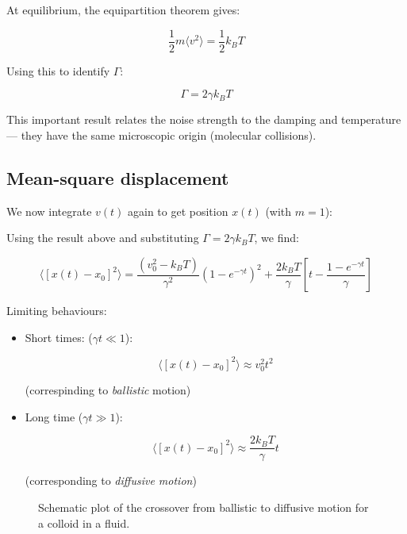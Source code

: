 \documentclass[
  letterpaper,
  enabledeprecatedfontcommands]{report}
\begin{document}
At equilibrium, the equipartition theorem gives:

\[
\frac{1}{2} m \langle v^2 \rangle = \frac{1}{2} k_B T
\]

Using this to identify \(\Gamma\):

\[
\Gamma = 2 \gamma k_B T
\]

This important result relates the noise strength to the damping and
temperature --- they have the same microscopic origin (molecular
collisions).

\subsection{Mean-square displacement}\label{mean-square-displacement}

We now integrate \(v(t)\) again to get position \(x(t)\) (with
\(m = 1\)):

Using the result above and substituting \(\Gamma = 2\gamma k_B T\), we
find:

\[
\langle [x(t) - x_0]^2 \rangle = \frac{(v_0^2 - k_B T)}{\gamma^2} (1 - e^{-\gamma t})^2 + \frac{2 k_B T}{\gamma} \left[ t - \frac{1 - e^{-\gamma t}}{\gamma} \right]
\]

Limiting behaviours:

\begin{itemize}
\item
  Short times: (\(\gamma t \ll 1\)):

  \[
  \langle [x(t) - x_0]^2 \rangle \approx v_0^2 t^2
  \]

  (correspinding to \emph{ballistic} motion)
\item
  Long time (\(\gamma t \gg 1\)):

  \[
  \langle [x(t) - x_0]^2 \rangle \approx \frac{2 k_B T}{\gamma} t
  \]

  (corresponding to \emph{diffusive motion})
\end{itemize}

\begin{figure}


\caption{\label{fig-browniancross}Schematic plot of the crossover from
ballistic to diffusive motion for a colloid in a fluid.}

\end{figure}%
\end{document}
